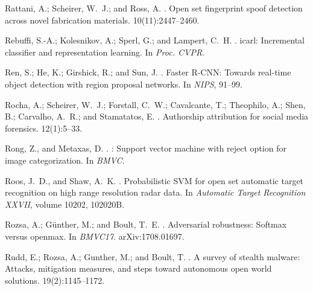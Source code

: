 \documentclass[letterpaper]{article}
\begin{document}
\begin{thebibliography}{}
Rattani, A.; Scheirer, W.~J.; and Ross, A.
.
\newblock Open set fingerprint spoof detection across novel fabrication
  materials.
  10(11):2447--2460.

Rebuffi, S.-A.; Kolesnikov, A.; Sperl, G.; and Lampert, C.~H.
.
\newblock icarl: {Incremental} classifier and representation learning.
\newblock In {\em Proc. {CVPR}}.

Ren, S.; He, K.; Girshick, R.; and Sun, J.
.
\newblock Faster {R-CNN}: Towards real-time object detection with region
  proposal networks.
\newblock In {\em NIPS},  91--99.

Rocha, A.; Scheirer, W.~J.; Forstall, C.~W.; Cavalcante, T.; Theophilo, A.;
  Shen, B.; Carvalho, A.~R.; and Stamatatos, E.
.
\newblock Authorship attribution for social media forensics.
 12(1):5--33.

Rong, Z., and Metaxas, D.
.
: Support vector machine with reject option for image
  categorization.
\newblock In {\em BMVC}.

Roos, J.~D., and Shaw, A.~K.
.
\newblock Probabilistic {SVM} for open set automatic target recognition on high
  range resolution radar data.
\newblock In {\em Automatic {Target} {Recognition} {XXVII}}, volume 10202,
  102020B.

Rozsa, A.; G{\"u}nther, M.; and Boult, T.~E.
.
\newblock Adversarial robustness: Softmax versus openmax.
\newblock In {\em BMVC17}.
\newblock arXiv:1708.01697.

Rudd, E.; Rozsa, A.; Gunther, M.; and Boult, T.
.
\newblock A survey of stealth malware: {Attacks}, mitigation measures, and
  steps toward autonomous open world solutions.
 19(2):1145--1172.


\end{thebibliography}
\end{document}

